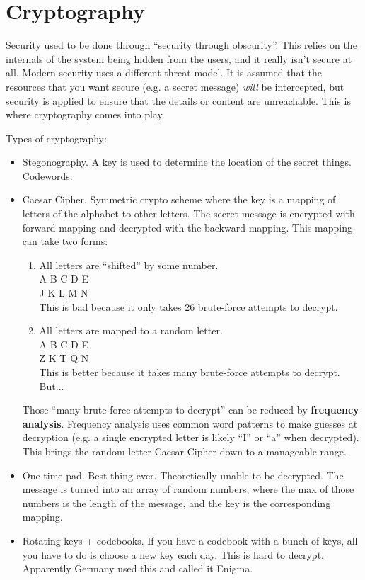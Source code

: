 \documentclass[twoside]{article}
\begin{document}
\section{Cryptography}
Security used to be done through ``security through obscurity''. This relies on
the internals of the system being hidden from the users, and it really isn't
secure at all. Modern security uses a different threat model. It is assumed that
the resources that you want secure (e.g. a secret message) \textit{will} be
intercepted, but security is applied to ensure that the details or content are
unreachable. This is where cryptography comes into play.

Types of cryptography:
\begin{itemize}
    \item Stegonography. A key is used to determine the location of the secret
    things. Codewords.
    \item Caesar Cipher. Symmetric crypto scheme where the key is a mapping of
    letters of the alphabet to other letters. The secret message is encrypted
    with forward mapping and decrypted with the backward mapping. This mapping
    can take two forms:
        \begin{enumerate}
            \item All letters are ``shifted'' by some number. \\
            A B C D E \\
            J K L M N \\
            This is bad because it only takes 26 brute-force attempts to
            decrypt.
            \item All letters are mapped to a random letter. \\
            A B C D E \\
            Z K T Q N \\
            This is better because it takes many brute-force attempts to
            decrypt. But...
        \end{enumerate}
    Those ``many brute-force attempts to decrypt'' can be reduced by
    \textbf{frequency analysis}. Frequency analysis uses common word patterns to
    make guesses at decryption (e.g. a single encrypted letter is likely ``I''
    or ``a'' when decrypted). This brings the random letter Caesar Cipher down
    to a manageable range.
    \item One time pad. Best thing ever. Theoretically unable to be decrypted.
    The message is turned into an array of random numbers, where the max of
    those numbers is the length of the message, and the key is the
    corresponding mapping.
    \item Rotating keys + codebooks. If you have a codebook with a bunch of
    keys, all you have to do is choose a new key each day. This is hard to
    decrypt. Apparently Germany used this and called it Enigma.
\end{itemize}
\end{document}
